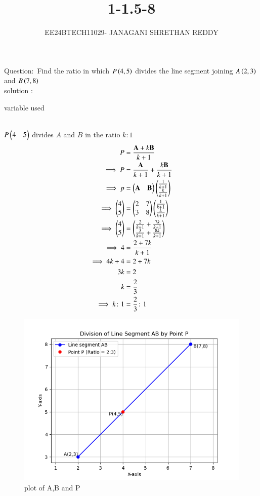 \documentclass[journal]{IEEEtran}
\begin{document}
 


\vspace{3cm}

\title{1-1.5-8}
\author{EE24BTECH11029- JANAGANI SHRETHAN REDDY}
\maketitle
\bigskip
\renewcommand{\thefigure}{\theenumi}
\renewcommand{\thetable}{\theenumi}

Question$\colon$
     Find the ratio in which $P\left(4,5\right)$ divides the line segment joining $A\left(2,3\right)$ and $B\left(7,8\right)$\\

solution $\colon$
\begin{table}[h!]
 \centering
 
 \caption{variable used}
\end{table}\\
 $P\begin{pmatrix}4&5\end{pmatrix}$ divides $A$ and $B$ in the ratio $k\colon1$
\begin{align}
    P&=\frac{\vec{A}+k\vec{B}}{k+1}\\
\implies P&=\frac{\vec{A}}{k+1}+\frac{k\vec{B}}{k+1}\\
\implies p&=\myvec{\Vec{A}&\Vec{B}}\myvec{\frac{1}{k+1}\\\frac{k}{k+1}}\\
\implies \myvec{4\\5}&=\myvec{2&7\\3&8}\myvec{\frac{1}{k+1}\\\frac{k}{k+1}}\\
\implies \myvec{4\\5}&=\myvec{\frac{2}{k+1}+\frac{7k}{k+1}\\\frac{3}{k+1}+\frac{8k}{k+1}}\\
\implies 4&=\frac{2+7k}{k+1}\\
\implies 4k+4&=2+7k\\
3k&=2\\
k&=\frac{2}{3}\\
\implies k\colon1&=\frac{2}{3}\colon1
 \end{align}
 \begin{figure}[h!]
  \centering
  \includegraphics[width=1\linewidth]{fig.png}
  \caption{plot of A,B and P}
 \end{figure}
 
\end{document}

